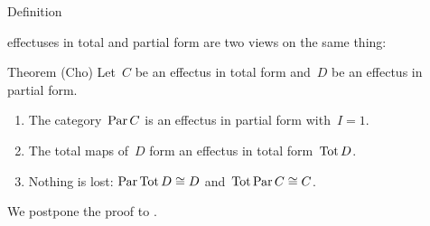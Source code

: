 \documentclass[b]{subfiles}
\begin{document}
\begin{parsec}
\begin{point}{Definition}
\begin{point}
    effectuses in total and partial form are two views
    on the same thing: \cite{kentapartial,effintro}
\end{point}
\end{point}
\begin{point}{Theorem (Cho)}%
Let~$C$ be an effectus in total form
and~$D$ be an effectus in partial form.
\begin{enumerate}
\item
The category~$\operatorname{Par} C$ is an effectus in partial form
        with~$I = 1$.
\item
The total maps of~$D$ form an effectus in total form~$\operatorname{Tot} D$.
\item
    Nothing is lost:
    $\operatorname{Par} \operatorname{Tot} D \cong D$ and~$\operatorname{Tot} \operatorname{Par} C \cong C$.
\end{enumerate}
\begin{point}%
We postpone the proof to .
\end{point}
\end{point}
\end{parsec}
\end{document}
